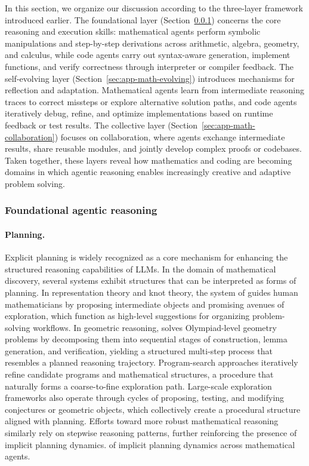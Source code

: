 In this section, we organize our discussion according to the three-layer framework introduced earlier. The foundational layer (Section~\ref{sec:app-math-planning}) concerns the core reasoning and execution skills: mathematical agents perform symbolic manipulations and step-by-step derivations across arithmetic, algebra, geometry, and calculus, while code agents carry out syntax-aware generation, implement functions, and verify correctness through interpreter or compiler feedback. The self-evolving layer (Section~\ref{sec:app-math-evolving}) introduces mechanisms for reflection and adaptation. Mathematical agents learn from intermediate reasoning traces to correct missteps or explore alternative solution paths, and code agents iteratively debug, refine, and optimize implementations based on runtime feedback or test results. The collective layer (Section~\ref{sec:app-math-collaboration}) focuses on collaboration, where agents exchange intermediate results, share reusable modules, and jointly develop complex proofs or codebases. Taken together, these layers reveal how mathematics and coding are becoming domains in which agentic reasoning enables increasingly creative and adaptive problem solving.


\subsubsection{Foundational agentic reasoning}
\label{sec:app-math-planning}


\paragraph{Planning.}

Explicit planning is widely recognized as a core mechanism for enhancing the structured 
reasoning capabilities of LLMs. In the domain of mathematical discovery, several systems exhibit structures that can be interpreted as forms of planning. In representation theory and knot theory, the system of \citet{davies2021advancing} guides human mathematicians by proposing intermediate objects and promising avenues of exploration, which function as high-level suggestions for organizing problem-solving workflows. In geometric reasoning, \citet{trinh2024solving} solves Olympiad-level geometry problems by decomposing them into sequential stages of construction, lemma generation, and verification, yielding a structured multi-step process that resembles a planned reasoning trajectory. Program-search approaches \citep{romera2024mathematical} iteratively refine candidate programs and mathematical structures, a procedure that naturally forms a coarse-to-fine exploration path. Large-scale exploration frameworks \citep{georgiev2025mathematical,swirszcz2025advancing} also operate through cycles of proposing, testing, and modifying conjectures or geometric objects, which collectively create a procedural structure aligned with planning. Efforts toward more robust mathematical reasoning \citep{luong2025towards} similarly rely on stepwise reasoning patterns, further reinforcing the presence of implicit planning dynamics. of implicit planning dynamics across mathematical agents.

